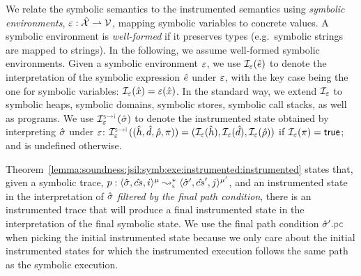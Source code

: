 We relate the symbolic semantics to the instrumented semantics using 
\emph{symbolic environments}, $\varepsilon : \hat{\mathcal{X}} \rightharpoonup \mathcal{V}$, mapping 
symbolic variables to concrete values. 
A symbolic environment is \emph{well-formed} if it preserves types (e.g.~symbolic strings are mapped to strings). In the following, we  
assume well-formed symbolic environments. 
%
Given a symbolic environment $\varepsilon$, we use $\mathcal{I}_\varepsilon(\hat{e})$ to denote the
interpretation of the symbolic expression $\hat{e}$ under $\varepsilon$, with the key case
being the one for symbolic variables: $\mathcal{I}_\varepsilon(\hat{x}) = \varepsilon(\hat{x})$. In the
standard way, we extend
$\mathcal{I}_\varepsilon$ to symbolic heaps, symbolic domains, symbolic stores, symbolic call stacks,
as well as programs. We use $\interpret{\symbinst}{\senv}(\sstate)$ to 
denote the instrumented state obtained by interpreting $\hat{\sigma}$ under $\varepsilon$:
$\interpret{\symbinst}{\senv}((\sheap, \sdom, \sstore, \pc)) = (\shorthand(\sheap), \shorthand(\sdom), \shorthand(\sstore))$ if $\mathcal{I}_\varepsilon(\pi) = {\sf true}$; and is undefined otherwise.

Theorem~\ref{lemma:soundness:jsil:symb:exe:instrumented:instrumented} states 
that, given a symbolic trace, $\prog : \transabssemrule{\sstate, \scs, i}{\sstate', \scs', j}{\mode}{\mode'}{\symbolic}$,
 and an instrumented state in the interpretation of $\hat{\sigma}$ \emph{filtered by the final 
 path condition}, there is an instrumented trace that will produce a final instrumented state 
 in the interpretation of the final symbolic state. 
 We use the final path condition $\sstate'.\pcsel$ when picking the initial 
 instrumented state because we only care about the initial instrumented states for which 
the instrumented execution follows the same path as the symbolic execution. 



